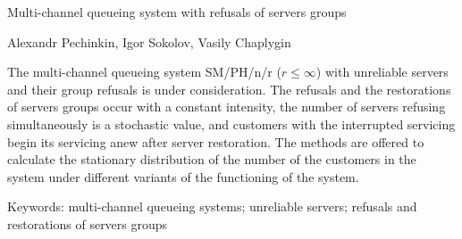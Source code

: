     Multi-channel queueing system with refusals of servers groups
     
     Alexandr Pechinkin, Igor Sokolov, Vasily Chaplygin
     
     The multi-channel queueing system SM/PH/n/r ($r\leq \infty$) with unreliable servers and 
their group refusals is under consideration. The refusals and the restorations of servers groups 
occur with a constant intensity, the number of servers refusing simultaneously is a stochastic 
value, and customers with the interrupted servicing begin its servicing anew after server 
restoration. The methods are offered to calculate the stationary distribution of the number of the 
customers in the system under different variants of the functioning of the system.
     
     Keywords: multi-channel queueing systems; unreliable servers; refusals and restorations of 
servers groups
     